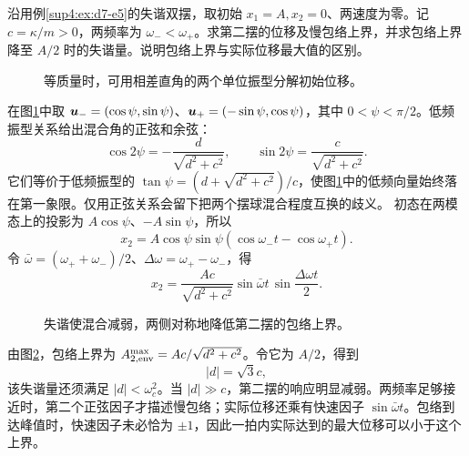 \begin{exercise}[失谐对拍振包络的抑制（选做）]\label{deep4:problem-exercise-6}\label{deep4:ex:d7-h6}
沿用例\ref{sup4:ex:d7-e5}的失谐双摆，取初始 $x_1=A,x_2=0$、两速度为零。记 $c=\kappa/m>0$，两频率为 $\omega_-<\omega_+$。求第二摆的位移及慢包络上界，并求包络上界降至 $A/2$ 时的失谐量。说明包络上界与实际位移最大值的区别。
\end{exercise}
\begin{figure}[H]\centering
{}
\caption{等质量时，可用相差直角的两个单位振型分解初始位移。}\label{deep4:fig:d7-h6-q}
\end{figure}
\begin{solution}
在图\ref{deep4:fig:d7-h6-q}中取 $\bm{u}_-=(\cos\psi,\sin\psi)$、$\bm{u}_+=(-\sin\psi,\cos\psi)$，其中 $0<\psi<\pi/2$。低频振型关系给出混合角的正弦和余弦：
\[
\cos2\psi=-\frac d{\sqrt{d^2+c^2}},\qquad
\sin2\psi=\frac c{\sqrt{d^2+c^2}}.
\]
它们等价于低频振型的 $\tan\psi=(d+\sqrt{d^2+c^2})/c$，使图\ref{deep4:fig:d7-h6-q}中的低频向量始终落在第一象限。仅用正弦关系会留下把两个摆球混合程度互换的歧义。
初态在两模态上的投影为 $A\cos\psi$、$-A\sin\psi$，所以
\[
x_2=A\cos\psi\sin\psi(\cos\omega_-t-\cos\omega_+t).
\]
令 $\bar\omega=(\omega_++\omega_-)/2$、$\Delta\omega=\omega_+-\omega_-$，得
\[
\boxed{x_2=\frac{Ac}{\sqrt{d^2+c^2}}\sin\bar\omega t\,
\sin\frac{\Delta\omega t}{2}.}
\]
\begin{figure}[H]\centering
{}
\caption{失谐使混合减弱，两侧对称地降低第二摆的包络上界。}\label{deep4:fig:d7-h6-s}
\end{figure}
由图\ref{deep4:fig:d7-h6-s}，包络上界为 $A_{2,\rm env}^{\max}=Ac/\sqrt{d^2+c^2}$。令它为 $A/2$，得到
\[
\boxed{|d|=\sqrt3c,}
\]
该失谐量还须满足 $|d|<\omega_c^2$。当 $|d|\gg c$，第二摆的响应明显减弱。两频率足够接近时，第二个正弦因子才描述慢包络；实际位移还乘有快速因子 $\sin\bar\omega t$。包络到达峰值时，快速因子未必恰为 $\pm1$，因此一拍内实际达到的最大位移可以小于这个上界。
\end{solution}


